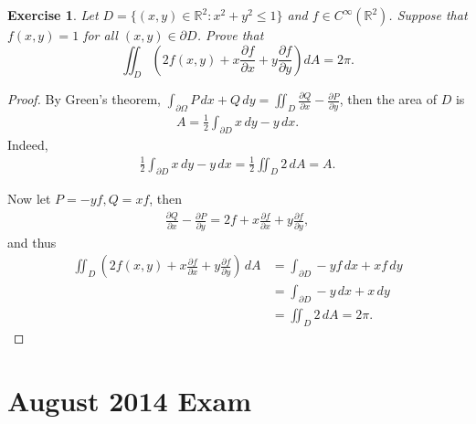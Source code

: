 \documentclass[11pt]{article}
\newtheorem{exercise}{Exercise}[section]
\theoremstyle{definition}
\numberwithin{equation}{subsection}
\begin{document}
\begin{exercise}
Let $D =\{(x, y)\in\mathbb{R}^2 : x^2 + y^2\leq 1\}$ and $f\in C^\infty(\mathbb{R}^2)$. Suppose that $f(x, y) = 1$ for all
$(x, y)\in\partial D$. Prove that
$$
\iint_D \left(2f(x,y)+x\frac{\partial f}{\partial x}+y\frac{\partial f}{\partial y}\right)dA=2\pi.
$$
\end{exercise}
\begin{proof}
By Green's theorem, $  \int_{\partial \Omega} P\, dx + Q\, dy = \iint_D \frac{\partial Q}{\partial x} - \frac{\partial P}{\partial y}$, then the area of $D$ is 
\begin{align*}
    A = \frac{1}{2} \int_{\partial D} x\, dy - y\, dx.
\end{align*}
Indeed, 
\begin{align*}
    \frac{1}{2} \int_{\partial D} x\, dy - y\, dx = \frac{1}{2} \iint_D 2\, dA = A.
\end{align*}

Now let $P = -yf, Q = xf$, then 
\begin{align*}
    \frac{\partial Q}{\partial x} - \frac{\partial P}{\partial y} = 2f + x \frac{\partial f}{\partial x} + y \frac{\partial f}{\partial y},
\end{align*}
and thus
\begin{align*}
    \iint_D \left(2f(x,y)+x\frac{\partial f}{\partial x}+y\frac{\partial f}{\partial y}\right)\, dA & = \int_{\partial D} -yf\, dx + x f\, dy \\
    & = \int_{\partial D} -y \, dx + x \, dy \\
    & = \iint_D 2\, dA = 2\pi.
\end{align*}
\end{proof}


\newpage
\section{August 2014 Exam}
\end{document}
